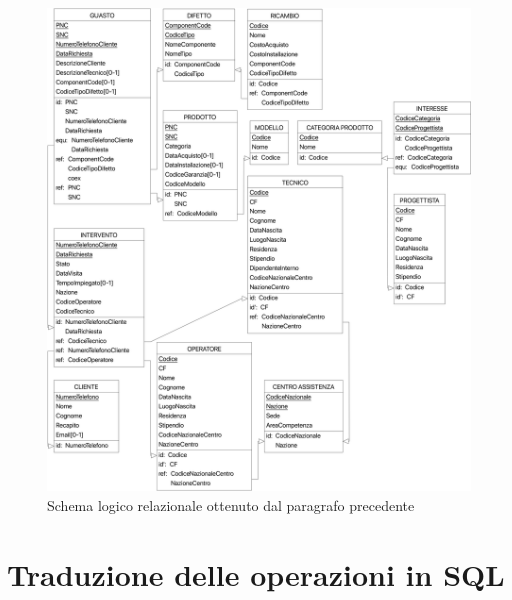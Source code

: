 \documentclass[a4paper, 12pt]{report}
\begin{document}
\begin{figure}[H]
	\centering
	\includegraphics[width=\linewidth]{images/Logic.png}
	\caption{Schema logico relazionale ottenuto dal paragrafo precedente}
\end{figure}

\section{Traduzione delle operazioni in SQL}
\end{document}
